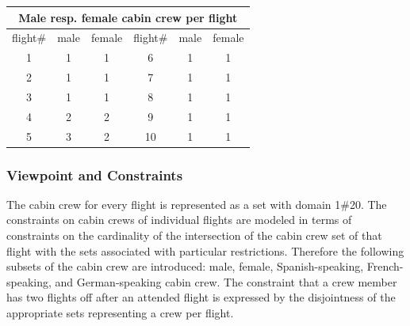 \documentclass[a4paper,halfparskip]{scrartcl}
\begin{document}
\label{table3}
\begin{tabular}{||c|c|c||c|c|c||}
\hline
\multicolumn{6}{||c||}{Male resp. female cabin crew per flight}\\
\hline
flight$\#$ & male & female & flight$\#$ & male & female\\
\hline 
1 & 1 & 1 & 6 & 1 & 1\\
\hline
2 & 1 & 1 & 7 & 1 & 1 \\
\hline
3 & 1 & 1 & 8 & 1 & 1 \\
\hline
4 & 2 & 2 & 9 & 1 & 1\\
\hline
5 & 3 & 2 & 10 & 1 & 1\\
\hline   
\end{tabular}

\subsubsection{Viewpoint and Constraints}
The cabin crew for every flight is represented as a set
with domain 1$\#$20. 
The constraints on cabin crews of individual flights are 
modeled in terms of constraints on the cardinality of the 
intersection of the cabin crew set of that flight with the 
sets associated with particular restrictions. Therefore 
the following subsets of the cabin crew are introduced: 
male, female, Spanish-speaking, French-speaking, and 
German-speaking cabin crew. The constraint that a crew 
member has two flights off after an attended flight is 
expressed by the disjointness of the appropriate sets 
representing a crew per flight. 
\end{document}

